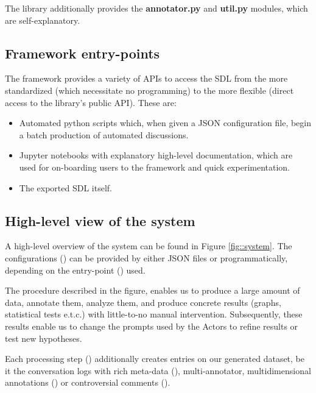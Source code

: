 The library additionally provides the \textbf{annotator.py} and \textbf{util.py} modules, which are self-explanatory.


\subsection{Framework entry-points}
\label{ssec:system:entrypoints}

The framework provides a variety of APIs to access the \ac{SDL} from the more standardized (which necessitate no programming) to the more flexible (direct access to the library's public \ac{API}). These are:

\begin{itemize}
	\item Automated python scripts which, when given a \ac{JSON} configuration file, begin a batch production of automated discussions.
	
	\item Jupyter notebooks with explanatory high-level documentation, which are used for on-boarding users to the framework and quick experimentation.
	
	\item The exported \ac{SDL} itself.
\end{itemize}


\subsection{High-level view of the system}
\label{ssec:system:overview}

A high-level overview of the system can be found in Figure \ref{fig::system}. The configurations () can be provided by either \ac{JSON} files or programmatically, depending on the entry-point () used. 

The procedure described in the figure, enables us to produce a large amount of data, annotate them, analyze them, and produce concrete results (graphs, statistical tests e.t.c.) with little-to-no manual intervention. Subsequently, these results enable us to change the prompts used by the Actors to refine results or test new hypotheses.

Each processing step () additionally creates entries on our generated dataset, be it the conversation logs with rich meta-data (), multi-annotator, multidimensional annotations () or controversial comments ().

